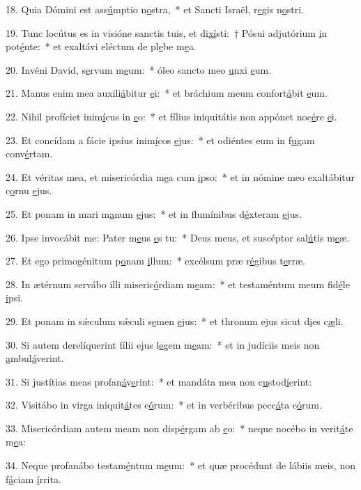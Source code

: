 18. Quia Dómini est ass\uline{ú}mptio n\uline{o}stra,~* et Sancti Israël, r\uline{e}gis n\uline{o}stri.\par 
19. Tunc locútus es in visióne sanctis tuis, et di\uline{xí}sti:~† Pósui adjutórium \uline{i}n pot\uline{é}nte:~* et exaltávi eléctum de pl\uline{e}be m\uline{e}a.\par 
20. Invéni David, s\uline{e}rvum m\uline{e}um:~* óleo sancto meo \uline{u}nxi \uline{e}um.\par 
21. Manus enim mea auxili\uline{á}bitur \uline{e}i:~* et bráchium meum confort\uline{á}bit \uline{e}um.\par 
22. Nihil profíciet inim\uline{í}cus in \uline{e}o:~* et fílius iniquitátis non appónet noc\uline{é}re \uline{e}i.\par 
23. Et concídam a fácie ipsíus inim\uline{í}cos \uline{e}jus:~* et odiéntes eum in f\uline{u}gam conv\uline{é}rtam.\par 
24. Et véritas mea, et misericórdia m\uline{e}a cum \uline{i}pso:~* et in nómine meo exaltábitur c\uline{o}rnu \uline{e}jus.\par 
25. Et ponam in mari m\uline{a}num \uline{e}jus:~* et in flumínibus d\uline{é}xteram \uline{e}jus.\par 
26. Ipse invocábit me: Pater m\uline{e}us \uline{e}s tu:~* Deus meus, et suscéptor sal\uline{ú}tis m\uline{e}æ.\par 
27. Et ego primogénitum p\uline{o}nam \uline{i}llum:~* excélsum præ r\uline{é}gibus t\uline{e}rræ.\par 
28. In ætérnum servábo illi miseric\uline{ó}rdiam m\uline{e}am:~* et testaméntum meum fid\uline{é}le \uline{i}psi.\par 
29. Et ponam in sǽculum sǽculi s\uline{e}men \uline{e}jus:~* et thronum ejus sicut d\uline{i}es c\uline{æ}li.\par 
30. Si autem derelíquerint fílii ejus l\uline{e}gem m\uline{e}am:~* et in judíciis meis non \uline{a}mbul\uline{á}verint.\par 
31. Si justítias meas profan\uline{á}v\uline{e}rint:~* et mandáta mea non c\uline{u}stod\uline{í}erint:\par 
32. Visitábo in virga iniquit\uline{á}tes e\uline{ó}rum:~* et in verbéribus pecc\uline{á}ta e\uline{ó}rum.\par 
33. Misericórdiam autem meam non disp\uline{é}rgam ab \uline{e}o:~* neque nocébo in verit\uline{á}te m\uline{e}a:\par 
34. Neque profanábo testam\uline{é}ntum m\uline{e}um:~* et quæ procédunt de lábiis meis, non f\uline{á}ciam \uline{í}rrita.\par 
